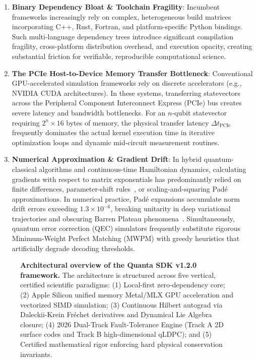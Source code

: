 \documentclass[aps,prx,twocolumn,superscriptaddress,nofootinbib]{revtex4-2}
\begin{document}
\begin{enumerate}
    \item \textbf{Binary Dependency Bloat \& Toolchain Fragility}: Incumbent frameworks increasingly rely on complex, heterogeneous build matrices incorporating C++, Rust, Fortran, and platform-specific Python bindings. Such multi-language dependency trees introduce significant compilation fragility, cross-platform distribution overhead, and execution opacity, creating substantial friction for verifiable, reproducible computational science.
    \item \textbf{The PCIe Host-to-Device Memory Transfer Bottleneck}: Conventional GPU-accelerated simulation frameworks rely on discrete accelerators (e.g., NVIDIA CUDA architectures). In these systems, transferring statevectors across the Peripheral Component Interconnect Express (PCIe) bus creates severe latency and bandwidth bottlenecks. For an $n$-qubit statevector requiring $2^n \times 16$ bytes of memory, the physical transfer latency $\Delta t_{\text{PCIe}}$ frequently dominates the actual kernel execution time in iterative optimization loops and dynamic mid-circuit measurement routines.
    \item \textbf{Numerical Approximation \& Gradient Drift}: In hybrid quantum-classical algorithms and continuous-time Hamiltonian dynamics, calculating gradients with respect to matrix exponentials has predominantly relied on finite differences, parameter-shift rules~\cite{schuld2019evaluating}, or scaling-and-squaring Pad\'e approximations. In numerical practice, Pad\'e expansions accumulate norm drift errors exceeding $1.3 \times 10^{-6}$, breaking unitarity in deep variational trajectories and obscuring Barren Plateau phenomena~\cite{mcclean2018barren,fontana2024adjoint}. Simultaneously, quantum error correction (QEC) simulators frequently substitute rigorous Minimum-Weight Perfect Matching (MWPM) with greedy heuristics that artificially degrade decoding thresholds.
\end{enumerate}

\begin{figure}[t]
\centering

\caption{\textbf{Architectural overview of the Quanta SDK v1.2.0 framework.} The architecture is structured across five vertical, certified scientific paradigms: (1) Local-first zero-dependency core; (2) Apple Silicon unified memory Metal/MLX GPU acceleration and vectorized SIMD simulation; (3) Continuous Hilbert autograd via Daleckii-Krein Fr\'echet derivatives and Dynamical Lie Algebra closure; (4) 2026 Dual-Track Fault-Tolerance Engine (Track A 2D surface codes and Track B high-dimensional qLDPC); and (5) Certified mathematical rigor enforcing hard physical conservation invariants.}
\label{fig:arch_overview}
\end{figure}
\end{document}
